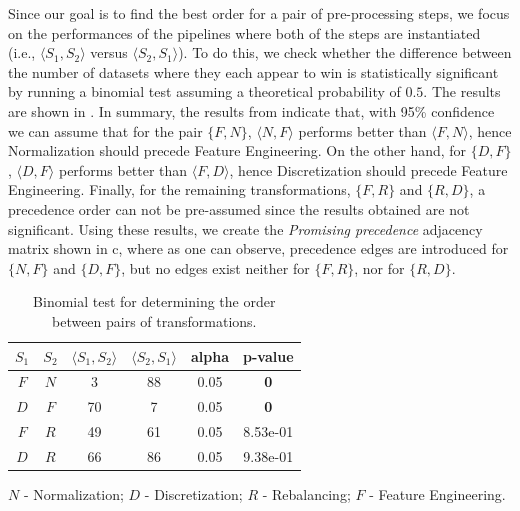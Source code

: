 \begin{example}
Since our goal is to find the best order for a pair of pre-processing steps, we focus on the performances of the pipelines where both of the steps are instantiated (i.e., $\langle S_1, S_2 \rangle$ versus $\langle S_2, S_1 \rangle$).
To do this, we check whether the difference between the number of datasets where they each appear to win is statistically significant by running a binomial test assuming a theoretical probability of $0.5$.
The results are shown in .
In summary, the results from  indicate that, with 95\% confidence we can assume that for the pair $\{F, N\}$, $\langle N, F \rangle$ performs better than $\langle F, N \rangle$, hence Normalization should precede Feature Engineering.
On the other hand, for $\{D, F\}$, $\langle D, F \rangle$ performs better than $\langle F, D \rangle$, hence Discretization should precede Feature Engineering.
Finally, for the remaining transformations, $\{F, R\}$ and $\{R, D\}$, a precedence order can not be pre-assumed since the results obtained are not significant.
Using these results, we create the \textit{Promising precedence} adjacency matrix shown in c, where as one can observe, precedence edges are introduced for $\{N, F\}$ and $\{D, F\}$, but no edges exist neither for $\{F, R\}$, nor for $\{R, D\}$.
\end{example}



\begin{table}[t]
	\centering
	\footnotesize
	\begin{threeparttable}
		\caption{
			Binomial test for determining the order between pairs of transformations. 
		}
		\label{tbl:significance-test}
		\begin{tabular}{@{}cccccc@{}}
			\toprule
			$S_1$ & $S_2$ & $\langle S_1, S_2 \rangle$ & $\langle S_2, S_1 \rangle$ & alpha & p-value\\ \midrule
			$F$ & $N$ & 3 & 88 & 0.05 &  \textbf{0} \\
			$D$ & $F$ & 70 & 7 & 0.05 &  \textbf{0}  \\
			$F$ & $R$ & 49 & 61 & 0.05 & 8.53e-01 \\
			$D$ & $R$ & 66 & 86 & 0.05 & 9.38e-01 \\ \bottomrule
		\end{tabular}
		\begin{tablenotes}
		\centering
		\scriptsize
		\item$N$ - Normalization; $D$ - Discretization; $R$ - Rebalancing; $F$ - Feature Engineering. 
		\end{tablenotes}
	\end{threeparttable}
\end{table}


